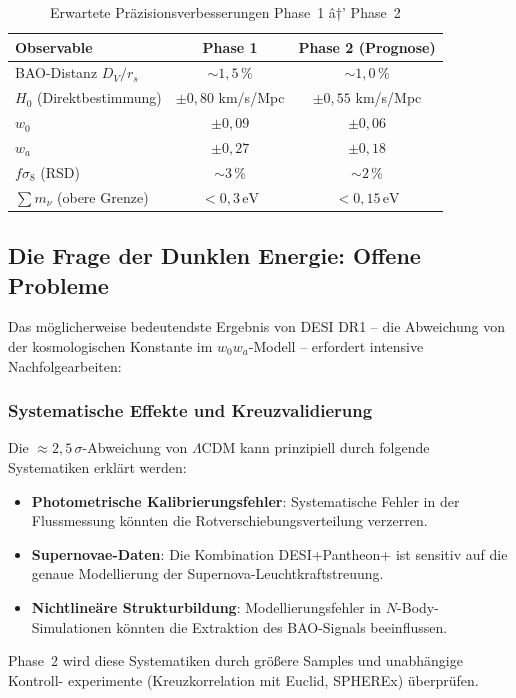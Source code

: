 ﻿\documentclass[a4paper,12pt]{article}
\theoremstyle{definition}
\theoremstyle{remark}
\begin{document}
\begin{table}[H]
  \centering
  \caption{Erwartete Präzisionsverbesserungen Phase~1 â†’ Phase~2}
  \label{tab:precision}
  \begin{tabular}{lcc}
    \toprule
    \textbf{Observable} & \textbf{Phase 1} & \textbf{Phase 2 (Prognose)} \\
    \midrule
    BAO-Distanz $D_V/r_s$ & $\sim 1{,}5\,\%$ & $\sim 1{,}0\,\%$ \\
    $H_0$ (Direktbestimmung) & $\pm 0{,}80$ km/s/Mpc & $\pm 0{,}55$ km/s/Mpc \\
    $w_0$ & $\pm 0{,}09$ & $\pm 0{,}06$ \\
    $w_a$ & $\pm 0{,}27$ & $\pm 0{,}18$ \\
    $f\sigma_8$ (RSD) & $\sim 3\,\%$ & $\sim 2\,\%$ \\
    $\sum m_\nu$ (obere Grenze) & $< 0{,}3\,\mathrm{eV}$ & $< 0{,}15\,\mathrm{eV}$ \\
    \bottomrule
  \end{tabular}
\end{table}

\subsection{Die Frage der Dunklen Energie: Offene Probleme}

Das möglicherweise bedeutendste Ergebnis von DESI DR1 -- die Abweichung von der
kosmologischen Konstante im $w_0 w_a$-Modell -- erfordert intensive Nachfolgearbeiten:

\subsubsection*{Systematische Effekte und Kreuzvalidierung}
Die $\approx 2{,}5\,\sigma$-Abweichung von $\Lambda$CDM kann prinzipiell durch
folgende Systematiken erklärt werden:
\begin{itemize}
  \item \textbf{Photometrische Kalibrierungsfehler}: Systematische Fehler in
    der Flussmessung könnten die Rotverschiebungsverteilung verzerren.
  \item \textbf{Supernovae-Daten}: Die Kombination DESI+Pantheon+ ist sensitiv
    auf die genaue Modellierung der Supernova-Leuchtkraftstreuung.
  \item \textbf{Nichtlineäre Strukturbildung}: Modellierungsfehler in
    $N$-Body-Simulationen könnten die Extraktion des BAO-Signals beeinflussen.
\end{itemize}
Phase~2 wird diese Systematiken durch größere Samples und unabhängige Kontroll-
experimente (Kreuzkorrelation mit Euclid, SPHEREx) überprüfen.
\end{document}
